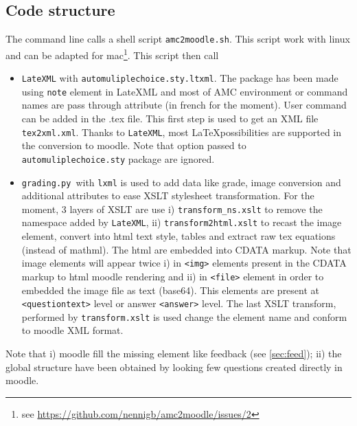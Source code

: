 \documentclass[a4paper]{article}
\newcommand{\elem}[1]{\texttt{<#1>}}
\newcommand{\py}{\texttt{grading.py}~}
\begin{document}
\subsection{Code structure}
The command line calls a shell script \texttt{amc2moodle.sh}. This script work with linux and can be adapted for mac\footnote{see \url{https://github.com/nennigb/amc2moodle/issues/2}}. This script then call
\begin{itemize}
\item \texttt{LateXML} with \texttt{automuliplechoice.sty.ltxml}. The package has been made using \texttt{note} element in LateXML and most of  AMC environment or command names are pass through attribute (in french for the moment). User command can be added in the .tex file. This first step is used to get an XML file \texttt{tex2xml.xml}. Thanks to \texttt{LateXML}, most \LaTeX possibilities are supported in the conversion to moodle. Note that option passed to \texttt{automuliplechoice.sty} package are ignored.

\item \py with \texttt{lxml} is used to add data like grade, image conversion and additional attributes to ease XSLT stylesheet transformation. For the moment, 3 layers of XSLT are use i) \texttt{transform\_ns.xslt} to remove the namespace added by \texttt{LateXML}, ii) \texttt{transform2html.xslt} to recast the image element, convert into html text style, tables and extract raw tex equations (instead of mathml). The html are embedded into CDATA markup.
Note that image elements will appear twice i) in \elem{img} elements present in the CDATA markup to html moodle rendering and ii) in \elem{file} element in order to embedded the image file as text (base64). This elements are present at \elem{questiontext} level or answer \elem{answer} level.
The last XSLT transform, performed by \texttt{transform.xslt} is used change the element name and conform to moodle XML format.
\end{itemize}
Note that i) moodle fill the missing element like feedback (see \ref{sec:feed}); ii) the global structure have been obtained by looking few questions created directly in moodle. 
% 
\end{document}
